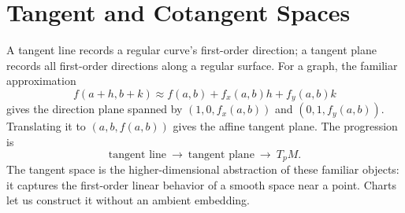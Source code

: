 \section{Tangent and Cotangent Spaces}
\label{sec:tangent-cotangent}
A tangent line records a regular curve's first-order direction; a tangent
plane records all first-order directions along a regular surface. For a graph,
the familiar approximation
\[
f(a+h,b+k)\approx f(a,b)+f_x(a,b)h+f_y(a,b)k
\]
gives the direction plane spanned by $(1,0,f_x(a,b))$ and
$(0,1,f_y(a,b))$. Translating it to $(a,b,f(a,b))$ gives the affine
tangent plane. The progression is
\[
\text{tangent line}\ \longrightarrow\ \text{tangent plane}
\ \longrightarrow\ T_pM.
\]
The tangent space is the higher-dimensional abstraction of these familiar
objects: it captures the first-order linear behavior of a smooth space
near a point. Charts let us construct it without an ambient embedding.

